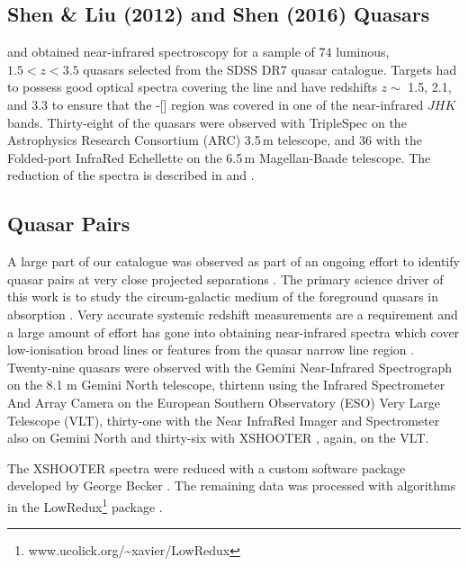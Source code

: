 \subsection{Shen \& Liu (2012) and Shen (2016) Quasars}

\citet{shen16a} and \citet{shen12} obtained near-infrared spectroscopy for a sample of 74 luminous, $1.5 < z < 3.5$ quasars selected from the SDSS DR7 quasar catalogue. 
Targets had to possess good optical spectra covering the  line and have redshifts $z\sim$ 1.5, 2.1, and 3.3 to ensure that the \hbns-[] region was covered in one of the near-infrared $JHK$ bands.
Thirty-eight of the quasars were observed with TripleSpec \citep{wilson04} on the Astrophysics Research Consortium (ARC) 3.5\,m telescope, and 36 with the Folded-port InfraRed Echellette \citep[FIRE;][]{simcoe10} on the 6.5\,m Magellan-Baade telescope.
The reduction of the spectra is described in \citet{shen16a} and \citet{shen12}. 

\subsection{Quasar Pairs}

A large part of our catalogue was observed as part of an ongoing effort to identify quasar pairs at very close projected separations \citep[Quasars Probing Quasars\footnote{www.ucolick.org/\textasciitilde xavier/QPQ/Quasars\_Probing\_Quasars} (QPQ);][]{hennawi06a,hennawi10}. 
The primary science driver of this work is to study the circum-galactic medium of the foreground quasars in absorption \citep{hennawi06b}.
Very accurate systemic redshift measurements are a requirement and a large amount of effort has gone into obtaining near-infrared spectra which cover low-ionisation broad lines or features from the quasar narrow line region \citep{prochaska09,lau15,hennawi15}. 
Twenty-nine quasars were observed with the Gemini Near-Infrared Spectrograph \citep[GNIRS;][]{elias06} on the 8.1 m Gemini North telescope, thirtenn using the Infrared Spectrometer And Array Camera \citep[ISAAC;][]{moorwood98b} on the European Southern Observatory (ESO) Very Large Telescope (VLT), thirty-one with the Near InfraRed Imager and Spectrometer \citep[NIRI;][]{hodapp03} also on Gemini North and thirty-six with XSHOOTER \citep{vernet11}, again, on the VLT. 

The  XSHOOTER  spectra  were  reduced  with  a  custom  software  package  developed  by  George  Becker \citep[for details, see][]{lau15}. 
The remaining data was processed with algorithms in the LowRedux\footnote{www.ucolick.org/\textasciitilde xavier/LowRedux} package \citep[see][]{prochaska09}.

